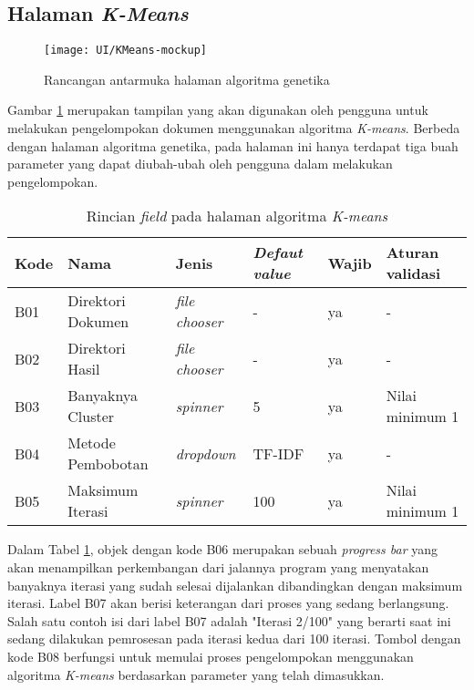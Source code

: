 \subsection{Halaman \textit{K-Means}}
\label{sub:ui-kmeans}
\begin{figure}[H]
	\begin{center}
		\texttt{[image: UI/KMeans-mockup]}
		\caption{Rancangan antarmuka halaman algoritma genetika}
		\label{fig:UI-KMeans}
	\end{center}
\end{figure}

Gambar \ref{fig:UI-KMeans} merupakan tampilan yang akan digunakan oleh pengguna untuk melakukan pengelompokan dokumen menggunakan algoritma \textit{K-means}. Berbeda dengan halaman algoritma genetika, pada halaman ini hanya terdapat tiga buah parameter yang dapat diubah-ubah oleh pengguna dalam melakukan pengelompokan.

\begin{table}[H]
	\renewcommand{\arraystretch}{2}
	\begin{tabularx}{\textwidth}{l X l X l X} \hline
		\textbf{Kode} & \textbf{Nama} & \textbf{Jenis} & \textbf{\textit{Defaut value}} & \textbf{Wajib} & \textbf{Aturan validasi} \\ \hline
		B01 & Direktori Dokumen & \textit{file chooser} & - & ya & - \\ \hline
		B02 & Direktori Hasil & \textit{file chooser} & - & ya & - \\ \hline
		B03 & Banyaknya Cluster & \textit{spinner} & 5 & ya & Nilai minimum 1 \\ \hline
		B04 & Metode Pembobotan & \textit{dropdown} & TF-IDF & ya & - \\ \hline
		B05 & Maksimum Iterasi & \textit{spinner} & 100 & ya & Nilai minimum 1\\ \hline
	\end{tabularx}
	\caption{Rincian \textit{field} pada halaman algoritma \textit{K-means}}
	\label{tbl:field-KMeans}
\end{table}

Dalam Tabel \ref{tbl:field-KMeans}, objek dengan kode B06 merupakan sebuah \textit{progress bar} yang akan menampilkan perkembangan dari jalannya program yang menyatakan banyaknya iterasi yang sudah selesai dijalankan dibandingkan dengan maksimum iterasi. Label B07 akan berisi keterangan dari proses yang sedang berlangsung. Salah satu contoh isi dari label B07 adalah "Iterasi 2/100" yang berarti saat ini sedang dilakukan pemrosesan pada iterasi kedua dari 100 iterasi. Tombol dengan kode B08 berfungsi untuk memulai proses pengelompokan menggunakan algoritma \textit{K-means} berdasarkan parameter yang telah dimasukkan.
